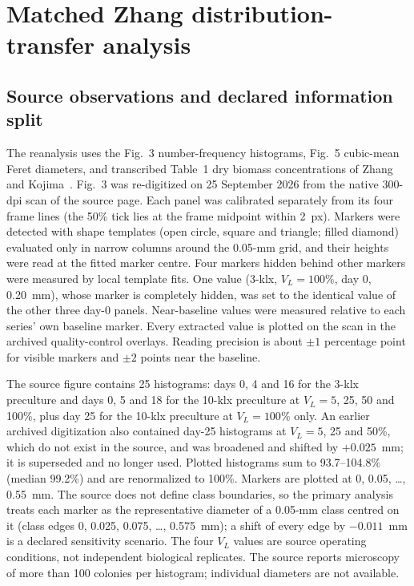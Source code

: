\section{Matched Zhang distribution-transfer analysis}
\label{app:zhang-matched}

\subsection{Source observations and declared information split}

The reanalysis uses the Fig.~3 number-frequency histograms, Fig.~5 cubic-mean Feret diameters, and transcribed Table~1 dry biomass concentrations of Zhang and Kojima~\cite{ZhangKojima1998}. Fig.~3 was re-digitized on 25 September 2026 from the native 300-dpi scan of the source page. Each panel was calibrated separately from its four frame lines (the 50\% tick lies at the frame midpoint within 2~px). Markers were detected with shape templates (open circle, square and triangle; filled diamond) evaluated only in narrow columns around the 0.05-mm grid, and their heights were read at the fitted marker centre. Four markers hidden behind other markers were measured by local template fits. One value (3-klx, $V_L=100\%$, day 0, 0.20~mm), whose marker is completely hidden, was set to the identical value of the other three day-0 panels. Near-baseline values were measured relative to each series' own baseline marker. Every extracted value is plotted on the scan in the archived quality-control overlays. Reading precision is about $\pm1$ percentage point for visible markers and $\pm2$ points near the baseline.

The source figure contains 25 histograms: days 0, 4 and 16 for the 3-klx preculture and days 0, 5 and 18 for the 10-klx preculture at $V_L=5$, 25, 50 and 100\%, plus day 25 for the 10-klx preculture at $V_L=100\%$ only. An earlier archived digitization also contained day-25 histograms at $V_L=5$, 25 and 50\%, which do not exist in the source, and was broadened and shifted by $+0.025$~mm; it is superseded and no longer used. Plotted histograms sum to 93.7--104.8\% (median 99.2\%) and are renormalized to 100\%. Markers are plotted at 0, 0.05, \dots, 0.55~mm. The source does not define class boundaries, so the primary analysis treats each marker as the representative diameter of a 0.05-mm class centred on it (class edges 0, 0.025, 0.075, \dots, 0.575~mm); a shift of every edge by $-0.011$~mm is a declared sensitivity scenario. The four $V_L$ values are source operating conditions, not independent biological replicates. The source reports microscopy of more than 100 colonies per histogram; individual diameters are not available.

